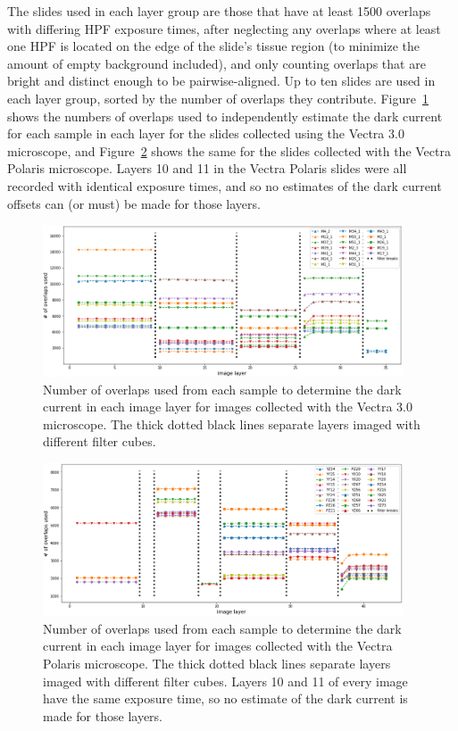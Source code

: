 \documentclass[letterpaper,11pt]{article}
\newcommand{\reffig}[1]{Figure~\ref{#1}}
\begin{document}
The slides used in each layer group are those that have at least 1500 overlaps with differing HPF exposure times, after neglecting any overlaps where at least one HPF is located on the edge of the slide's tissue region (to minimize the amount of empty background included), and only counting overlaps that are bright and distinct enough to be pairwise-aligned. Up to ten slides are used in each layer group, sorted by the number of overlaps they contribute. \reffig{fig:n_overlaps_used_vectra} shows the numbers of overlaps used to independently estimate the dark current for each sample in each layer for the slides collected using the Vectra 3.0 microscope, and \reffig{fig:n_overlaps_used_polaris} shows the same for the slides collected with the Vectra Polaris microscope. Layers 10 and 11 in the Vectra Polaris slides were all recorded with identical exposure times, and so no estimates of the dark current offsets can (or must) be made for those layers. 

\begin{figure}[!ht]
\centering
\includegraphics[width=0.95\textwidth]{images/methods/n_overlaps_used_vectra}
\caption{\footnotesize Number of overlaps used from each sample to determine the dark current in each image layer for images collected with the Vectra 3.0 microscope. The thick dotted black lines separate layers imaged with different filter cubes.}
\label{fig:n_overlaps_used_vectra}
\end{figure}

\begin{figure}[!ht]
\centering
\includegraphics[width=0.95\textwidth]{images/methods/n_overlaps_used_polaris}
\caption{\footnotesize Number of overlaps used from each sample to determine the dark current in each image layer for images collected with the Vectra Polaris microscope. The thick dotted black lines separate layers imaged with different filter cubes. Layers 10 and 11 of every image have the same exposure time, so no estimate of the dark current is made for those layers. }
\label{fig:n_overlaps_used_polaris}
\end{figure}
\end{document}
